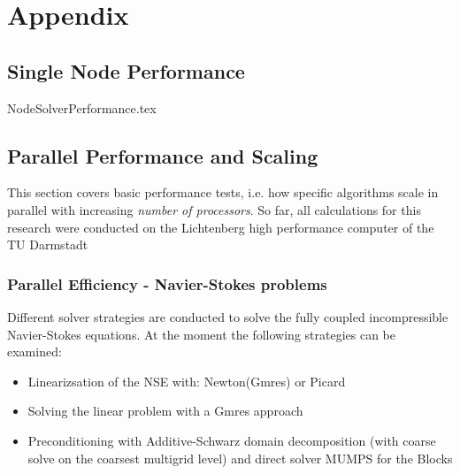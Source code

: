 \documentclass[a4paper,10pt]{report} %
\begin{document}
\part{Appendix}
\appendix

\chapter{Single Node Performance}
\label{sec:SingleNodePerformance}
{NodeSolverPerformance.tex}


\chapter{Parallel Performance and Scaling}
\label{sec:ParallelPerformance}
This section covers basic performance tests, i.e. how specific algorithms scale in parallel with increasing \emph{number of processors}. So far, all calculations for this research were conducted on the Lichtenberg high performance computer of the TU Darmstadt

\section{Parallel Efficiency - Navier-Stokes problems}
Different solver strategies are conducted to solve the fully coupled incompressible Navier-Stokes equations. At the moment the following strategies can be examined:
\begin{itemize}
	\item Linearizsation of the NSE with: Newton(Gmres) or Picard
	\item Solving the linear problem with a Gmres approach
	\item Preconditioning with Additive-Schwarz domain decomposition (with coarse solve on the coarsest multigrid level) and direct solver MUMPS for the Blocks
\end{itemize}
\end{document}
